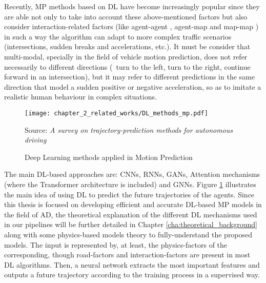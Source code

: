 Recently, \ac{MP} methods based on \ac{DL} have become increasingly popular since they are able not only to take into account these above-mentioned factors but also consider interaction-related factors (like agent-agent \cite{gupta2018social}, agent-map \cite{casas2018intentnet} and map-map \cite{liang2020learning}) in such a way the algorithm can adapt to more complex traffic scenarios (intersections, sudden breaks and accelerations, etc.). It must be consider that multi-modal, specially in the field of vehicle motion prediction, does not refer necessarily to different directions (\eg \ turn to the left, turn to the right, continue forward in an intersection), but it may refer to different predictions in the same direction that model a sudden positive or negative acceleration, so as to imitate a realistic human behaviour in complex situations. %

\begin{figure}[h]
	\centering
	\texttt{[image: chapter\_2\_related\_works/DL\_methods\_mp.pdf]}
	\caption{Deep Learning methods applied in Motion Prediction}
	Source: \textit{A survey on trajectory-prediction methods for autonomous driving} \cite{huang2022survey}
	\label{fig:chapter_2_related_works/DL_example_mp}
\end{figure}

The main \ac{DL}-based approaches are: \acp{CNN}, \acp{RNN}, \acp{GAN}, Attention mechanisms (where the Transformer architecture is included) and \acp{GNN}. Figure \ref{fig:chapter_2_related_works/DL_example_mp} illustrates the main idea of using \ac{DL} to predict the future trajectories of the agents. Since this thesis is focused on developing efficient and accurate \ac{DL}-based \ac{MP} models in the field of \ac{AD}, the theoretical explanation of the different \ac{DL} mechanisms used in our pipelines will be further detailed in Chapter \ref{cha:theoretical_background} along with some physics-based models theory to fully-understand the proposed models. The input is represented by, at least, the physics-factors of the corresponding, though road-factors and interaction-factors are present in most \ac{DL} algorithms. Then, a neural network extracts the most important features and outputs a future trajectory according to the training process in a supervised way. 

